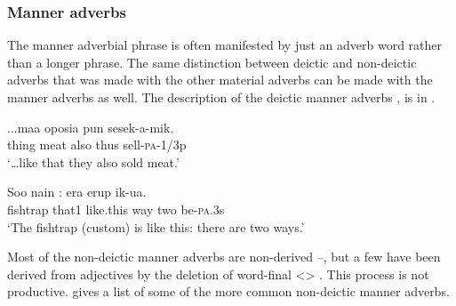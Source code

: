 \subsubsection{Manner adverbs}\label{sec:3.9.1.3}
{}
The manner adverbial phrase is often manifested by just an adverb word rather than a longer phrase. The same distinction between deictic and non-deictic adverbs that was made with the other material adverbs can be made with the manner adverbs as well. The description of the deictic manner adverbs ,  is in .

\ea%
\label{ex:3:x1935}
\gll ...maa oposia pun  sesek-a-mik. \\
thing meat also thus sell-\textsc{pa}-1/3p\\
\glt`{\dots}like that they also sold meat.'
\z

\ea%
\label{ex:3:x1936}
\gll Soo nain : era erup ik-ua. \\
fishtrap that1 like.this way two be-\textsc{pa}.3s\\
\glt`The fishtrap (custom) is like this: there are two ways.'
\z

Most of the non-deictic manner adverbs are non-derived --, but a few have been derived from adjectives by the deletion of word-final <>  . This process is not productive.  gives a list of some of the more common non-deictic manner adverbs.
 
